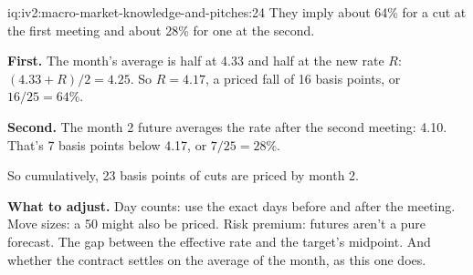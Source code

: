 \begin{solution}{iq:iv2:macro-market-knowledge-and-pitches:24}
They imply about 64\% for a cut at the first meeting and about 28\% for one at the second.

\textbf{First.} The month's average is half at 4.33 and half at the new rate $R$: $(4.33 + R)/2 = 4.25$. So $R = 4.17$, a priced fall of 16 basis points, or $16/25 = 64\%$.

\textbf{Second.} The month 2 future averages the rate after the second meeting: 4.10. That's 7 basis points below 4.17, or $7/25 = 28\%$.

So cumulatively, 23 basis points of cuts are priced by month 2.

\textbf{What to adjust.} Day counts: use the exact days before and after the meeting. Move sizes: a 50 might also be priced. Risk premium: futures aren't a pure forecast. The gap between the effective rate and the target's midpoint. And whether the contract settles on the average of the month, as this one does.

\end{solution}

